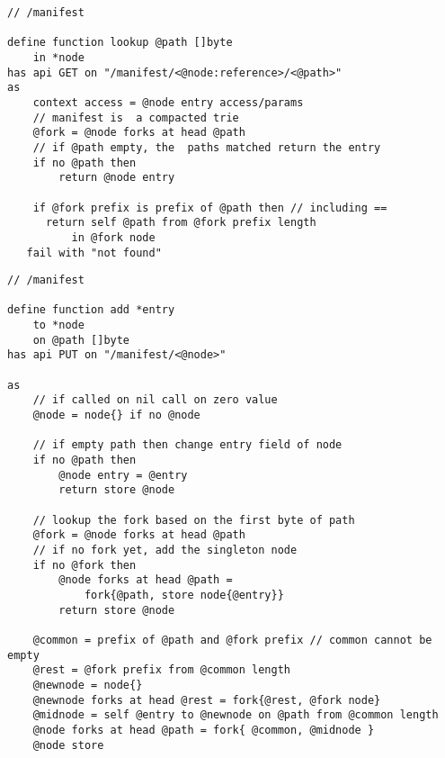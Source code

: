 \begin{definition}\label{def:manifests-lookup}
\begin{lstlisting}[language=buzz1]
// /manifest

define function lookup @path []byte
    in *node
has api GET on "/manifest/<@node:reference>/<@path>"
as 
    context access = @node entry access/params 
    // manifest is  a compacted trie
    @fork = @node forks at head @path 
    // if @path empty, the  paths matched return the entry
    if no @path then 
        return @node entry

    if @fork prefix is prefix of @path then // including == 
      return self @path from @fork prefix length
          in @fork node 
   fail with "not found"

\end{lstlisting}
\end{definition}


\begin{definition}\label{def:manifest-update}
\begin{lstlisting}[language=buzz1]
// /manifest

define function add *entry  
    to *node 
    on @path []byte 
has api PUT on "/manifest/<@node>"
    
as
    // if called on nil call on zero value
    @node = node{} if no @node 

    // if empty path then change entry field of node
    if no @path then
        @node entry = @entry
        return store @node

    // lookup the fork based on the first byte of path
    @fork = @node forks at head @path
    // if no fork yet, add the singleton node 
    if no @fork then
        @node forks at head @path =
            fork{@path, store node{@entry}}
        return store @node

    @common = prefix of @path and @fork prefix // common cannot be empty
    @rest = @fork prefix from @common length
    @newnode = node{}
    @newnode forks at head @rest = fork{@rest, @fork node}
    @midnode = self @entry to @newnode on @path from @common length 
    @node forks at head @path = fork{ @common, @midnode } 
    @node store
    

\end{lstlisting}
\end{definition}

